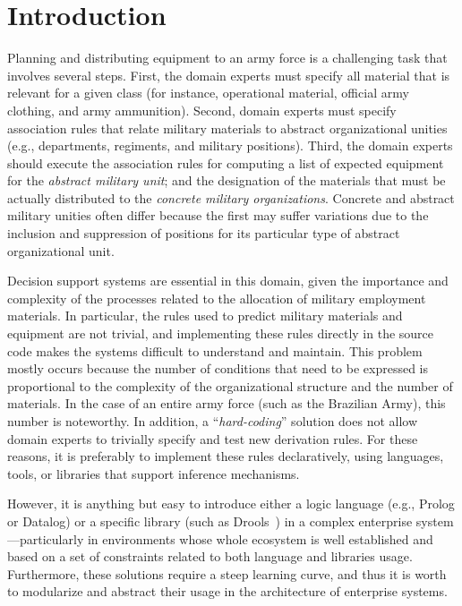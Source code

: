 \section{Introduction}\label{sec:Introduction}

Planning and distributing equipment to an army force is a
  challenging task that involves several steps. First, the
  domain experts must specify all material that is relevant
  for a given class (for instance, operational material, official army clothing,
  and army ammunition). Second, domain experts must specify association 
rules that relate military materials to abstract 
organizational unities (e.g., departments, regiments,
and military positions). Third, the domain experts should 
execute the association rules for computing a list of expected
equipment for the \emph{abstract military unit}; and the
designation of the materials that must be
actually distributed to the \emph{concrete military organizations}. Concrete and
abstract military unities often differ because the first may suffer
variations due to the inclusion and suppression of positions
for its particular type of abstract organizational unit.

Decision support systems are essential in this domain, given the importance and complexity of the processes related to the allocation of military employment materials. In particular, the rules used to predict military materials and equipment are not trivial, and implementing these rules directly in the source code makes the systems difficult to understand and maintain. This problem mostly occurs because the number of conditions that need to be expressed is proportional to the complexity of the organizational structure and the number of materials. In the case of an entire army force (such as the Brazilian Army), this number is noteworthy. In addition, a ``\emph{hard-coding}'' solution does not allow domain experts to trivially specify and test new derivation rules. For these reasons, it is preferably to implement these rules declaratively, using languages, tools, or libraries that
support inference mechanisms.

However, it is anything but easy to introduce either a logic language (e.g., Prolog or Datalog) or a specific library (such as Drools~\cite{browne2009}) in a complex enterprise system---particularly in environments whose whole ecosystem is well established and based on a set of constraints related to both language and libraries usage. Furthermore, these solutions require a steep learning curve, and thus it is worth to modularize and abstract their usage in the architecture of enterprise systems.

